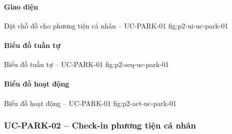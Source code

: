 \par\medskip
\noindent\begin{minipage}{\linewidth}
\paragraph{Giao diện}
  {Đặt chỗ đỗ cho phương tiện cá nhân -- UC-PARK-01}
  {fig:p2-ui-uc-park-01}
  {}
\end{minipage}\par

\clearpage
\paragraph{Biểu đồ tuần tự}
  {Biểu đồ tuần tự -- UC-PARK-01}
  {fig:p2-seq-uc-park-01}

\clearpage
\paragraph{Biểu đồ hoạt động}
  {Biểu đồ hoạt động -- UC-PARK-01}
  {fig:p2-act-uc-park-01}

\clearpage

\subsubsection{UC-PARK-02 -- Check-in phương tiện cá nhân}



